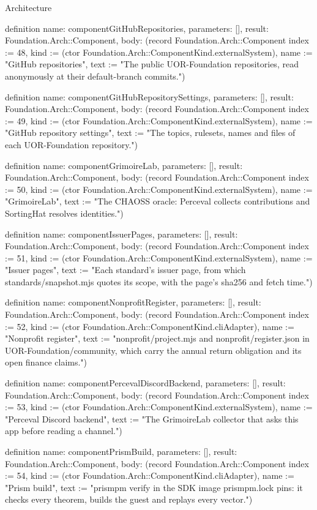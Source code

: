 \begin{lexlean}{Architecture}
\begin{semanticmodule}
definition{
  name: componentGitHubRepositories,
  parameters: [],
  result: Foundation.Arch::Component,
  body: (record Foundation.Arch::Component {index := 48, kind := (ctor Foundation.Arch::ComponentKind.externalSystem), name := "GitHub repositories", text := "The public UOR-Foundation repositories, read anonymously at their default-branch commits."})
}

definition{
  name: componentGitHubRepositorySettings,
  parameters: [],
  result: Foundation.Arch::Component,
  body: (record Foundation.Arch::Component {index := 49, kind := (ctor Foundation.Arch::ComponentKind.externalSystem), name := "GitHub repository settings", text := "The topics, rulesets, names and files of each UOR-Foundation repository."})
}

definition{
  name: componentGrimoireLab,
  parameters: [],
  result: Foundation.Arch::Component,
  body: (record Foundation.Arch::Component {index := 50, kind := (ctor Foundation.Arch::ComponentKind.externalSystem), name := "GrimoireLab", text := "The CHAOSS oracle: Perceval collects contributions and SortingHat resolves identities."})
}

definition{
  name: componentIssuerPages,
  parameters: [],
  result: Foundation.Arch::Component,
  body: (record Foundation.Arch::Component {index := 51, kind := (ctor Foundation.Arch::ComponentKind.externalSystem), name := "Issuer pages", text := "Each standard's issuer page, from which standards/snapshot.mjs quotes its scope, with the page's sha256 and fetch time."})
}

definition{
  name: componentNonprofitRegister,
  parameters: [],
  result: Foundation.Arch::Component,
  body: (record Foundation.Arch::Component {index := 52, kind := (ctor Foundation.Arch::ComponentKind.cliAdapter), name := "Nonprofit register", text := "nonprofit/project.mjs and nonprofit/register.json in UOR-Foundation/community, which carry the annual return obligation and its open finance claims."})
}

definition{
  name: componentPercevalDiscordBackend,
  parameters: [],
  result: Foundation.Arch::Component,
  body: (record Foundation.Arch::Component {index := 53, kind := (ctor Foundation.Arch::ComponentKind.externalSystem), name := "Perceval Discord backend", text := "The GrimoireLab collector that asks this app before reading a channel."})
}

definition{
  name: componentPrismBuild,
  parameters: [],
  result: Foundation.Arch::Component,
  body: (record Foundation.Arch::Component {index := 54, kind := (ctor Foundation.Arch::ComponentKind.cliAdapter), name := "Prism build", text := "prismpm verify in the SDK image prismpm.lock pins: it checks every theorem, builds the guest and replays every vector."})
}


\end{semanticmodule}
\end{lexlean}
